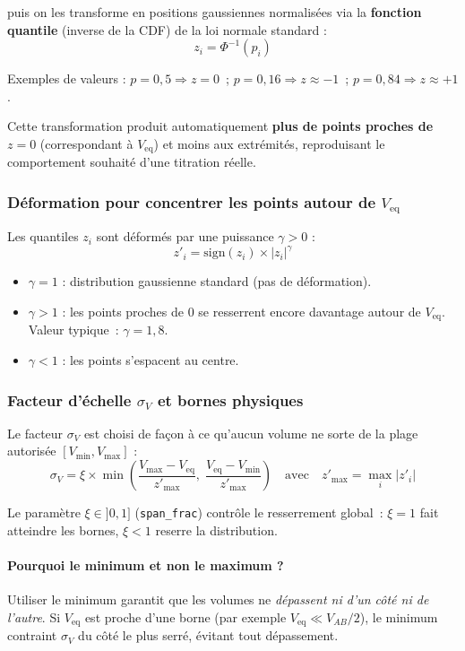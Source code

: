 \documentclass[12pt, a4paper]{article}
\begin{document}
puis on les transforme en positions gaussiennes normalisées via la
\textbf{fonction quantile} (inverse de la CDF) de la loi normale standard :
\[
z_i = \Phi^{-1}(p_i)
\]

Exemples de valeurs : $p = 0{,}5 \Rightarrow z = 0$~;
$p = 0{,}16 \Rightarrow z \approx -1$~;
$p = 0{,}84 \Rightarrow z \approx +1$.

Cette transformation produit automatiquement \textbf{plus de points
proches de $z = 0$} (correspondant à $V_\text{eq}$) et moins aux
extrémités, reproduisant le comportement souhaité d'une titration réelle.

\subsubsection{Déformation pour concentrer les points autour de $V_\text{eq}$}

Les quantiles $z_i$ sont déformés par une puissance $\gamma > 0$ :
\[
z'_i = \text{sign}(z_i) \times |z_i|^\gamma
\]

\begin{itemize}
  \item $\gamma = 1$ : distribution gaussienne standard (pas de déformation).
  \item $\gamma > 1$ : les points proches de 0 se resserrent encore davantage
        autour de $V_\text{eq}$. Valeur typique~: $\gamma = 1{,}8$.
  \item $\gamma < 1$ : les points s'espacent au centre.
\end{itemize}

\subsubsection{Facteur d'échelle $\sigma_V$ et bornes physiques}

Le facteur $\sigma_V$ est choisi de façon à ce qu'aucun volume ne sorte
de la plage autorisée $[V_\text{min}, V_\text{max}]$ :
\[
\sigma_V = \xi \times \min\!\left(
  \frac{V_\text{max} - V_\text{eq}}{z'_\text{max}},\;
  \frac{V_\text{eq} - V_\text{min}}{z'_\text{max}}
\right)
\quad \text{avec} \quad z'_\text{max} = \max_i |z'_i|
\]

Le paramètre $\xi \in ]0,1]$ (\texttt{span\_frac}) contrôle le resserrement
global~: $\xi = 1$ fait atteindre les bornes, $\xi < 1$ reserre la
distribution.

\paragraph{Pourquoi le minimum et non le maximum ?}
Utiliser le minimum garantit que les volumes ne \emph{dépassent ni d'un
côté ni de l'autre}. Si $V_\text{eq}$ est proche d'une borne (par exemple
$V_\text{eq} \ll V_{AB}/2$), le minimum contraint $\sigma_V$ du côté le
plus serré, évitant tout dépassement.
\end{document}
